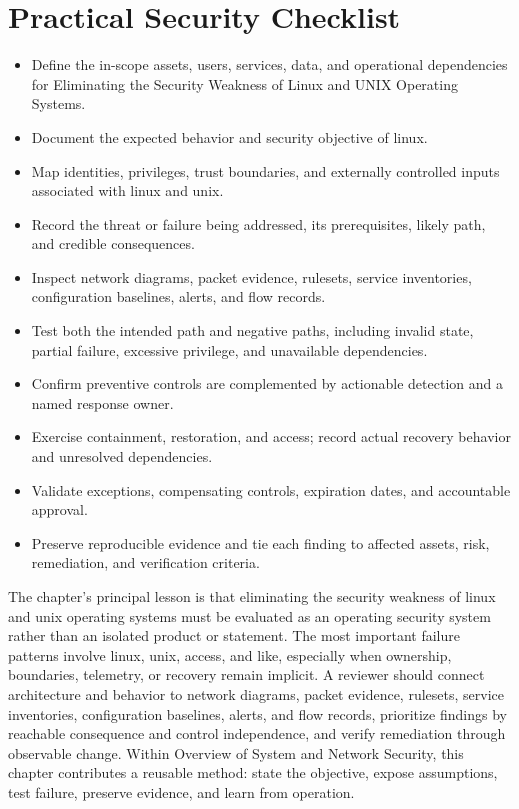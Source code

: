 \documentclass[11pt]{article}
\begin{document}
\section*{Practical Security Checklist}
\begin{itemize}[label=$\square$]
\item Define the in-scope assets, users, services, data, and operational dependencies for Eliminating the Security Weakness of Linux and UNIX Operating Systems.
\item Document the expected behavior and security objective of linux.
\item Map identities, privileges, trust boundaries, and externally controlled inputs associated with linux and unix.
\item Record the threat or failure being addressed, its prerequisites, likely path, and credible consequences.
\item Inspect network diagrams, packet evidence, rulesets, service inventories, configuration baselines, alerts, and flow records.
\item Test both the intended path and negative paths, including invalid state, partial failure, excessive privilege, and unavailable dependencies.
\item Confirm preventive controls are complemented by actionable detection and a named response owner.
\item Exercise containment, restoration, and access; record actual recovery behavior and unresolved dependencies.
\item Validate exceptions, compensating controls, expiration dates, and accountable approval.
\item Preserve reproducible evidence and tie each finding to affected assets, risk, remediation, and verification criteria.
\end{itemize}
\begin{synthesisbox}
The chapter's principal lesson is that eliminating the security weakness of linux and unix operating systems must be evaluated as an operating security system rather than an isolated product or statement. The most important failure patterns involve linux, unix, access, and like, especially when ownership, boundaries, telemetry, or recovery remain implicit. A reviewer should connect architecture and behavior to network diagrams, packet evidence, rulesets, service inventories, configuration baselines, alerts, and flow records, prioritize findings by reachable consequence and control independence, and verify remediation through observable change. Within Overview of System and Network Security, this chapter contributes a reusable method: state the objective, expose assumptions, test failure, preserve evidence, and learn from operation.
\end{synthesisbox}
\end{document}
